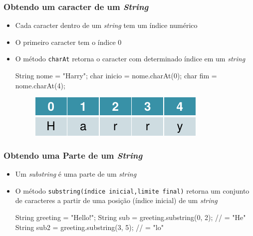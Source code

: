 \documentclass[xcolor={dvipsnames,table},aspectratio=169]{beamer}
\begin{document}
\begin{frame}[fragile]\frametitle{Obtendo um caracter de um \emph{String}}
\begin{itemize}
	\item Cada caracter dentro de um \emph{string} tem um índice numérico
	\item O primeiro caracter tem o índice $0$
	\item O método \texttt{charAt} retorna o caracter com determinado índice em um \emph{string}
\begin{javacode}
String nome = "Harry";
char inicio = nome.charAt(0);
char fim = nome.charAt(4);
\end{javacode}
\begin{figure}[h]
	\includegraphics[height=0.1\paperheight,center]{pucrs-ep-fprog-unidade_02-tipos_de_dados_fundamentais-laminas-string.png}
\end{figure}
\end{itemize}
\end{frame}

\begin{frame}[fragile]\frametitle{Obtendo uma Parte de um \emph{String}}
\begin{itemize}
	\item Um \emph{substring} é uma parte de um \emph{string}
	\item O método \texttt{substring(índice inicial,limite final)} retorna um conjunto de caracteres a partir de uma posição (índice inicial) de um \emph{string}
\begin{javacode}
String greeting = "Hello!";
String sub = greeting.substring(0, 2);  // = "He"
String sub2 = greeting.substring(3, 5); // = "lo"
\end{javacode}
\end{itemize}
\end{frame}
\end{document}

